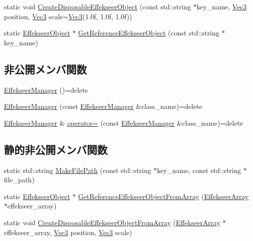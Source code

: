 \begin{DoxyCompactItemize}
\item 
static void \mbox{\hyperlink{class_effekseer_manager_a0b82fe25fbe1dacc0d904fb54267b2fa}{Create\+Disposable\+Effekseer\+Object}} (const std\+::string $\ast$key\+\_\+name, \mbox{\hyperlink{_vector3_d_8h_ab16f59e4393f29a01ec8b9bbbabbe65d}{Vec3}} position, \mbox{\hyperlink{_vector3_d_8h_ab16f59e4393f29a01ec8b9bbbabbe65d}{Vec3}} scale=\mbox{\hyperlink{_vector3_d_8h_ab16f59e4393f29a01ec8b9bbbabbe65d}{Vec3}}(1.\+0f, 1.\+0f, 1.\+0f))
\item 
static \mbox{\hyperlink{class_effekseer_object}{Effekseer\+Object}} $\ast$ \mbox{\hyperlink{class_effekseer_manager_a44878c9abb7f43521c7e8a9700668a28}{Get\+Reference\+Effekseer\+Object}} (const std\+::string $\ast$key\+\_\+name)
\end{DoxyCompactItemize}
\subsection*{非公開メンバ関数}
\begin{DoxyCompactItemize}
\item 
\mbox{\hyperlink{class_effekseer_manager_a4338611775d36aaef84ddb178b7f13ce}{Effekseer\+Manager}} ()=delete
\item 
\mbox{\hyperlink{class_effekseer_manager_ab6e170775c5ba410dc03b59eda589688}{Effekseer\+Manager}} (const \mbox{\hyperlink{class_effekseer_manager}{Effekseer\+Manager}} \&class\+\_\+name)=delete
\item 
\mbox{\hyperlink{class_effekseer_manager}{Effekseer\+Manager}} \& \mbox{\hyperlink{class_effekseer_manager_ade688aba495d8a9d74f2d8de98e9bb75}{operator=}} (const \mbox{\hyperlink{class_effekseer_manager}{Effekseer\+Manager}} \&class\+\_\+name)=delete
\end{DoxyCompactItemize}
\subsection*{静的非公開メンバ関数}
\begin{DoxyCompactItemize}
\item 
static std\+::string \mbox{\hyperlink{class_effekseer_manager_ad6c9359de20c955af42a72c145571168}{Make\+File\+Path}} (const std\+::string $\ast$key\+\_\+name, const std\+::string $\ast$file\+\_\+path)
\item 
static \mbox{\hyperlink{class_effekseer_object}{Effekseer\+Object}} $\ast$ \mbox{\hyperlink{class_effekseer_manager_a1469d014a3d10dd38dc7d03db7f2ebfe}{Get\+Reference\+Effekseer\+Object\+From\+Array}} (\mbox{\hyperlink{class_effekseer_array}{Effekseer\+Array}} $\ast$effekseer\+\_\+array)
\item 
static void \mbox{\hyperlink{class_effekseer_manager_ab8fd5fdd35e1336974f217797c010ee3}{Create\+Disposable\+Effekseer\+Object\+From\+Array}} (\mbox{\hyperlink{class_effekseer_array}{Effekseer\+Array}} $\ast$effekseer\+\_\+array, \mbox{\hyperlink{_vector3_d_8h_ab16f59e4393f29a01ec8b9bbbabbe65d}{Vec3}} position, \mbox{\hyperlink{_vector3_d_8h_ab16f59e4393f29a01ec8b9bbbabbe65d}{Vec3}} scale)
\end{DoxyCompactItemize}
